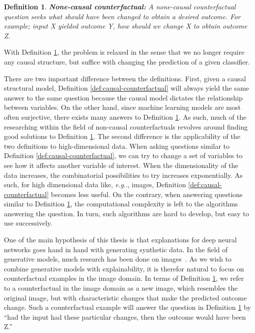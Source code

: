 \documentclass[11pt,a4paper,twoside,openright,final]{memoir}
\makeatletter
\newtheorem{definition}{Definition}
\DeclareRobustCommand\onedot{\futurelet\@let@token\@onedot}
\def\@onedot{\ifx\@let@token.\else.\null\fi\xspace}
\def\eg{\emph{e.g}\onedot} \def\Eg{\emph{E.g}\onedot}
\makeatother
\begin{document}
\begin{definition}\label{def:dl-counterfactual}
    \textbf{None-causal counterfactual:} A none-causal counterfactual question seeks what should have been changed to obtain a desired outcome. For example; input X yielded outcome Y, how should we change X to obtain outcome Z. 
\end{definition}

With Definition \ref{def:dl-counterfactual}, the problem is relaxed in the sense that we no longer require any causal structure, but suffice with changing the prediction of a given classifier. 

There are two important difference between the definitions. 
First, given a causal structural model, Definition \ref{def:causal-counterfactual} will always yield the same answer to the same question because the causal model dictates the relationship between variables. 
On the other hand, since machine learning models are most often surjective, there exists many answers to Definition \ref{def:dl-counterfactual}.
As such, much of the researching within the field of non-causal counterfactuals revolves around finding good solutions to Definition \ref{def:dl-counterfactual}.
The second difference is the applicability of the two definitions to high-dimensional data.
When asking questions similar to Definition \ref{def:causal-counterfactual}, we can try to change a set of variables to see how it affects another variable of interest.
When the dimensionality of the data increases, the combinatorial possibilities to try increases exponentially. 
As such, for high dimensional data like, \eg, images, Definition \ref{def:causal-counterfactual} becomes less useful.
On the contrary, when answering questions similar to Definition \ref{def:dl-counterfactual}, the computational complexity is left to the algorithms answering the question. 
In turn, such algorithms are hard to develop, but easy to use successively.


One of the main hypothesis of this thesis is that explanations for deep neural networks goes hand in hand with generating synthetic data. 
In the field of generative models, much research has been done on images~\cite{realnvp, sngan, vae}.
As we wish to combine generative models with explainability, it is therefor natural to focus on counterfactual examples in the image domain.
In terms of Definition \ref{def:dl-counterfactual}, we refer to a counterfactual in the image domain as a new image, which resembles the original image, but with characteristic changes that make the predicted outcome change.
Such a counterfactual example will answer the question in Definition \ref{def:dl-counterfactual} by ``had the input had these particular changes, then the outcome would have been Z.''
\end{document}
